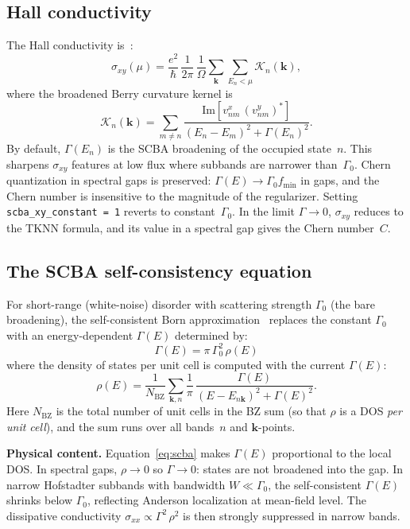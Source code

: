 \documentclass[11pt]{article}
\newcommand{\Gam}{\Gamma}
\newcommand{\BZ}{\mathrm{BZ}}
\begin{document}
\subsection{Hall conductivity}

The Hall conductivity is~\cite{TKNN1982,Streda1982}:
\begin{equation}\label{eq:sxy}
  \sigma_{xy}(\mu) = \frac{e^2}{\hbar}\,\frac{1}{2\pi}\,
  \frac{1}{\Omega}\sum_{\mathbf{k}} \sum_{E_n < \mu} \mathcal{K}_n(\mathbf{k}),
\end{equation}
where the broadened Berry curvature kernel is
\begin{equation}
  \mathcal{K}_n(\mathbf{k}) = \sum_{m \neq n}
  \frac{\mathrm{Im}[v^x_{nm}\, (v^y_{nm})^*]}
  {(E_n - E_m)^2 + \Gam(E_n)^2}.
\end{equation}
By default, $\Gam(E_n)$ is the SCBA broadening of the occupied
state~$n$.  This sharpens $\sigma_{xy}$ features at low flux where
subbands are narrower than~$\Gam_0$.  Chern quantization in spectral
gaps is preserved: $\Gam(E) \to \Gam_0 f_{\min}$ in gaps, and the
Chern number is insensitive to the magnitude of the regularizer.
Setting \texttt{scba\_xy\_constant = 1} reverts to constant~$\Gam_0$.
In the limit $\Gam \to 0$, $\sigma_{xy}$ reduces to the TKNN formula,
and its value in a spectral gap gives the Chern number~$C$.

\subsection{The SCBA self-consistency equation}

For short-range (white-noise) disorder with scattering strength
$\Gam_0$ (the bare broadening), the self-consistent Born
approximation~\cite{Ando1974} replaces the constant
$\Gam_0$ with an energy-dependent $\Gam(E)$ determined by:
\begin{equation}\label{eq:scba}
  \boxed{
  \Gam(E) = \pi\, \Gam_0^2\, \rho(E)
  }
\end{equation}
where the density of states per unit cell is computed with the
current $\Gam(E)$:
\begin{equation}\label{eq:rho}
  \rho(E) = \frac{1}{N_\BZ}\sum_{\mathbf{k},n}
  \frac{1}{\pi}\,\frac{\Gam(E)}{(E - E_{n\mathbf{k}})^2 + \Gam(E)^2}.
\end{equation}
Here $N_\BZ$ is the total number of unit cells in the BZ sum (so that
$\rho$ is a DOS \emph{per unit cell}), and the sum runs over all
bands~$n$ and $\mathbf{k}$-points.

\textbf{Physical content.}  Equation~\eqref{eq:scba} makes $\Gam(E)$
proportional to the local DOS.  In spectral gaps, $\rho \to 0$ so
$\Gam \to 0$: states are not broadened into the gap.  In narrow
Hofstadter subbands with bandwidth $W \ll \Gam_0$, the self-consistent
$\Gam(E)$ shrinks below $\Gam_0$, reflecting Anderson localization at
mean-field level.  The dissipative conductivity
$\sigma_{xx} \propto \Gam^2\, \rho^2$ is then strongly suppressed in
narrow bands.
\end{document}
